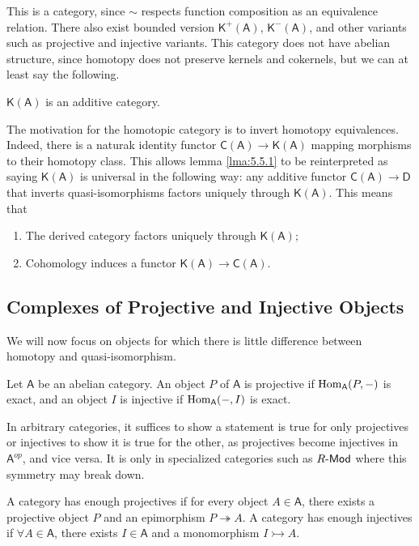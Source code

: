 This is a category, since $\sim $ respects function composition as an equivalence relation. There also exist bounded version $\mathsf{K} ^+(\mathsf{A} )$, $\mathsf{K} ^-(\mathsf{A} )$, and other variants such as projective and injective variants. This category does not have abelian structure, since homotopy does not preserve kernels and cokernels, but we can at least say the following.
\begin{lemma}\label{lma:5.5.2}
	$\mathsf{K} (\mathsf{A} )$ is an additive category.
\end{lemma}

The motivation for the homotopic category is to invert homotopy equivalences. Indeed, there is a naturak identity functor $\mathsf{C} (\mathsf{A} )\to \mathsf{K} (\mathsf{A} )$ mapping morphisms to their homotopy class. This allows lemma \ref{lma:5.5.1} to be reinterpreted as saying $\mathsf{K} (\mathsf{A})$ is universal in the following way: any additive functor $\mathsf{C} (\mathsf{A} )\to \mathsf{D} $ that inverts quasi-isomorphisms factors uniquely through $\mathsf{K} (\mathsf{A} )$. This means that
\begin{enumerate}
	\item The derived category factors uniquely through $\mathsf{K} (\mathsf{A} )$;
	\item Cohomology induces a functor $\mathsf{K} (\mathsf{A} )\to \mathsf{C} (\mathsf{A} )$.
\end{enumerate}
\subsection{Complexes of Projective and Injective Objects}
We will now focus on objects for which there is little difference between homotopy and quasi-isomorphism.
\begin{definition}\label{dfn:5.5.3}
	Let $\mathsf{A} $ be an abelian category. An object $P$ of $\mathsf{A} $ is projective if $\operatorname{Hom}_{\mathsf{A} }(P, -) $ is exact, and an object $I$ is injective if $\operatorname{Hom}_{\mathsf{A} }(-, I) $ is exact.
\end{definition}

In arbitrary categories, it suffices to show a statement is true for only projectives or injectives to show it is true for the other, as projectives become injectives in $\mathsf{A} ^{op} $, and vice versa. It is only in specialized categories such as $R\text{-}\mathsf{Mod} $ where this symmetry may break down.

\begin{definition}\label{dfn:5.5.4}
	A category has enough projectives if for every object $A\in \mathsf{A} $, there exists a projective object $P$ and an epimorphism $P\twoheadrightarrow A$. A category has enough injectives if $\forall A\in \mathsf{A} $, there exists $I\in \mathsf{A} $ and a monomorphism $I\rightarrowtail A$.
\end{definition}

